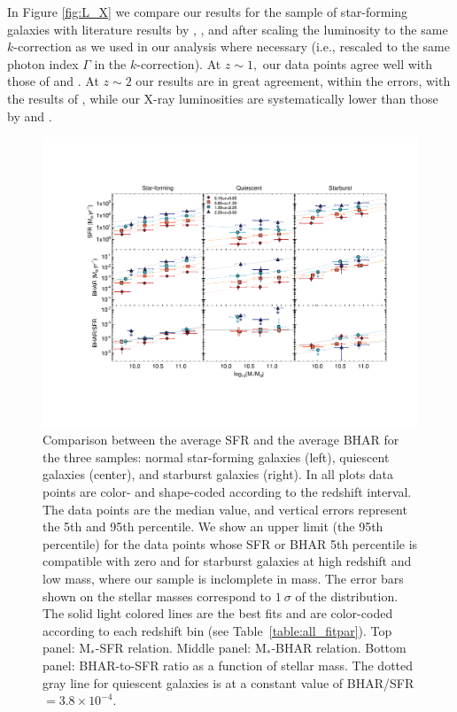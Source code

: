 In Figure \ref{fig:L_X} we compare our results for the sample of star-forming galaxies with literature results by \citet{2012ApJ...753L..30M}, \citet{2015ApJ...800L..10R}, and \citet{2018MNRAS.474.1225A} after scaling the luminosity to the same $k$-correction as we used in our analysis where necessary (i.e., rescaled to the same photon index $\Gamma$ in the $k$-correction). At $z\sim1,$ our data points agree well with those of \citet{2012ApJ...753L..30M} and \citet{2018MNRAS.474.1225A}.
At $z\sim2$ our results are in great agreement, within the errors, with the results of \citet{2018MNRAS.474.1225A}, while our X-ray luminosities are systematically lower than those by \citet{2012ApJ...753L..30M} and \citet{2015ApJ...800L..10R}.
   \begin{figure}
   \centering
   \includegraphics[trim={3.2cm 3.7cm 2cm 3.6cm}, clip,width=\textwidth]{Figs/Chapter2/SF_BH_all.pdf}
      \caption{Comparison between the average SFR and the average BHAR for the three samples: normal star-forming galaxies (left), quiescent galaxies (center), and starburst galaxies (right).
      In all plots data points are color- and shape-coded according to the redshift interval. The data points are the median value, and vertical errors represent the 5th and 95th percentile. We show an upper limit (the 95th percentile) for the data points whose SFR or BHAR 5th percentile is compatible with zero and for starburst galaxies at high redshift and low mass, where our sample is inclomplete in mass.
      The error bars shown on the stellar masses correspond to $1~\sigma$ of the distribution. The solid light colored lines are the best fits and are color-coded according to each redshift bin (see Table~\ref{table:all_fitpar}). 
      Top panel: M$_*$-SFR relation. 
      Middle panel: M$_*$-BHAR relation.
      Bottom panel: BHAR-to-SFR ratio as a function of stellar mass. The dotted gray line for quiescent galaxies is at a constant value of BHAR/SFR$=3.8\times 10^{-4}$.
              }
         \label{fig:SF_BH_all}
   \end{figure}
